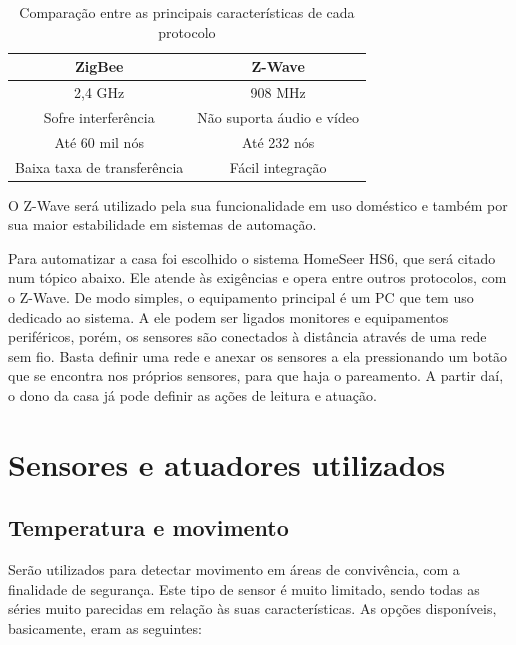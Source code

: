 \begin{table}
\begin{tabular}{|c|c|}
\hline 
ZigBee & Z-Wave\tabularnewline
\hline 
\hline 
2,4 GHz & 908 MHz\tabularnewline
\hline 
Sofre interferência & Não suporta áudio e vídeo\tabularnewline
\hline 
Até 60 mil nós & Até 232 nós\tabularnewline
\hline 
Baixa taxa de transferência & Fácil integração\tabularnewline
\hline 
\end{tabular}
\caption{Comparação entre as principais características de cada protocolo}
\end{table}

	O Z-Wave será utilizado pela sua funcionalidade em uso doméstico e também por sua maior estabilidade em sistemas de automação.

	Para automatizar a casa foi escolhido o sistema HomeSeer HS6, que será citado num tópico abaixo. Ele atende às exigências e opera entre outros protocolos, com o Z-Wave. De modo simples, o equipamento principal é um PC que tem uso dedicado ao sistema. A ele podem ser ligados monitores e equipamentos periféricos, porém, os sensores são conectados à distância através de uma rede sem fio. Basta definir uma rede e anexar os sensores a ela pressionando um botão que se encontra nos próprios sensores, para que haja o pareamento. A partir daí, o dono da casa já pode definir as ações de leitura e atuação.

\section{Sensores e atuadores utilizados}
\subsection{Temperatura e movimento}

	Serão utilizados para detectar movimento em áreas de convivência, com a finalidade de segurança. Este tipo de sensor é muito limitado, sendo todas as séries muito parecidas em relação às suas características. As opções disponíveis, basicamente, eram as seguintes:

